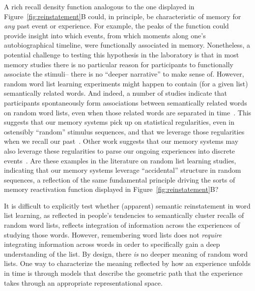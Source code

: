 \documentclass{article}
\begin{document}
A rich recall density function analogous to the one displayed in Figure~\ref{fig:reinstatement}B could, in principle, be characteristic of memory for \textit{any} past event or experience.  For example, the peaks of the function could provide insight into which events, from which moments along one's autobiographical timeline, were functionally associated in memory.  Nonetheless, a potential challenge to testing this hypothesis in the laboratory is that in most memory studies there is no particular reason for participants to functionally associate the stimuli-- there is no ``deeper narrative'' to make sense of.  However, random word list learning experiments might happen to contain (for a given list) semantically related words.  And indeed, a number of studies indicate that participants spontaneously form associations between semantically related words on random word lists, even when those related words are separated in time~\citep[e.g.,][]{WixtRohr94, MannKaha12, MannEtal12}.  This suggests that our memory systems pick up on statistical regularities, even in ostensibly ``random'' stimulus sequences, and that we leverage those regularities when we recall our past~\citep{PolyEtal09}.  Other work suggests that our memory systems may also leverage these regularities to parse our ongoing experiences into discrete events~\citep{SchaEtal13}.  Are these examples in the literature on random list learning studies, indicating that our memory systems leverage ``accidental'' structure in random sequences, a reflection of the same fundamental principle driving the sorts of memory reactivation function displayed in Figure~\ref{fig:reinstatement}B?

It is difficult to explicitly test whether (apparent) semantic reinstatement in word list learning, as reflected in people's tendencies to semantically cluster recalls of random word lists, reflects integration of information across the experiences of studying those words.  However, remembering word lists does not \textit{require} integrating information across words in order to specifically gain a deep understanding of the list.  By design, there \textit{is} no deeper meaning of random word lists.  One way to characterize the meaning reflected by how an experience unfolds in time is through models that describe the geometric path that the experience takes through an appropriate representational space.
\end{document}
